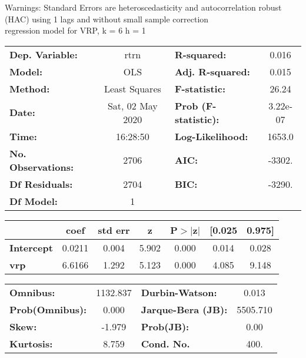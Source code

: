 Warnings: \newline
 [1] Standard Errors are heteroscedasticity and autocorrelation robust (HAC) using 1 lags and without small sample correction\\ 

regression model for VRP, k = 6 h = 1\begin{center}
\begin{tabular}{lclc}
\toprule
\textbf{Dep. Variable:}    &       rtrn       & \textbf{  R-squared:         } &     0.016   \\
\textbf{Model:}            &       OLS        & \textbf{  Adj. R-squared:    } &     0.015   \\
\textbf{Method:}           &  Least Squares   & \textbf{  F-statistic:       } &     26.24   \\
\textbf{Date:}             & Sat, 02 May 2020 & \textbf{  Prob (F-statistic):} &  3.22e-07   \\
\textbf{Time:}             &     16:28:50     & \textbf{  Log-Likelihood:    } &    1653.0   \\
\textbf{No. Observations:} &        2706      & \textbf{  AIC:               } &    -3302.   \\
\textbf{Df Residuals:}     &        2704      & \textbf{  BIC:               } &    -3290.   \\
\textbf{Df Model:}         &           1      & \textbf{                     } &             \\
\bottomrule
\end{tabular}
\begin{tabular}{lcccccc}
                   & \textbf{coef} & \textbf{std err} & \textbf{z} & \textbf{P$> |$z$|$} & \textbf{[0.025} & \textbf{0.975]}  \\
\midrule
\textbf{Intercept} &       0.0211  &        0.004     &     5.902  &         0.000        &        0.014    &        0.028     \\
\textbf{vrp}       &       6.6166  &        1.292     &     5.123  &         0.000        &        4.085    &        9.148     \\
\bottomrule
\end{tabular}
\begin{tabular}{lclc}
\textbf{Omnibus:}       & 1132.837 & \textbf{  Durbin-Watson:     } &    0.013  \\
\textbf{Prob(Omnibus):} &   0.000  & \textbf{  Jarque-Bera (JB):  } & 5505.710  \\
\textbf{Skew:}          &  -1.979  & \textbf{  Prob(JB):          } &     0.00  \\
\textbf{Kurtosis:}      &   8.759  & \textbf{  Cond. No.          } &     400.  \\
\bottomrule
\end{tabular}
\end{center}

